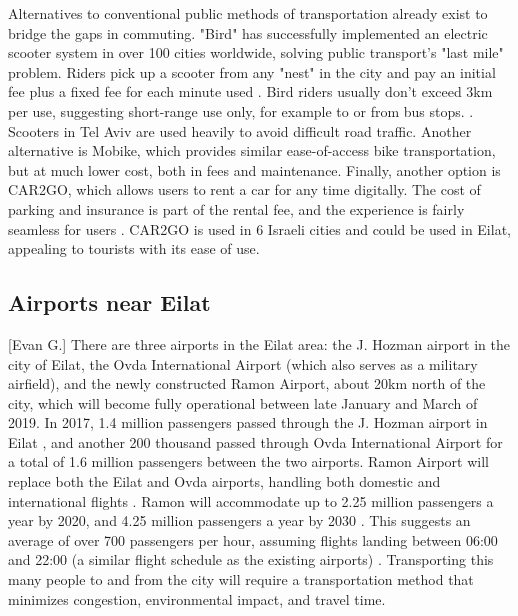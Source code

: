 \documentclass[12pt]{article}                         %
\begin{document}
Alternatives to conventional public methods of transportation already exist to bridge the gaps in commuting. "Bird" has successfully implemented an electric scooter system in over 100 cities worldwide, solving public transport's "last mile" problem. Riders pick up a scooter from any "nest" in the city and pay an initial fee plus a fixed fee for each minute used \cite{Raz-Chaimovich2018BirdGan}. Bird riders usually don't exceed 3km per use, suggesting short-range use only, for example to or from bus stops. \cite{Raz-Chaimovich2018BirdGan}. Scooters in Tel Aviv are used heavily to avoid difficult road traffic. Another alternative is Mobike, which provides similar ease-of-access bike transportation, but at much lower cost, both in fees and maintenance. Finally, another option is CAR2GO, which allows users to rent a car for any time digitally. The cost of parking and insurance is part of the rental fee, and the experience is fairly seamless for users \cite{Dori2018IsraeliStreet}. CAR2GO is used in 6 Israeli cities and could be used in Eilat, appealing to tourists with its ease of use.

\subsection{Airports near Eilat}[Evan G.]
There are three airports in the Eilat area: the J. Hozman airport in the city of Eilat, the Ovda International Airport (which also serves as a military airfield), and the newly constructed Ramon Airport, about 20km north of the city, which will become fully operational between late January and March of 2019. In 2017, 1.4 million passengers passed through the J. Hozman airport in Eilat \cite{IsraeliAirports}, and another 200 thousand passed through Ovda International Airport \cite{IsraeliAirports} for a total of 1.6 million passengers between the two airports. Ramon Airport will replace both the Eilat and Ovda airports, handling both domestic and international flights \cite{IsraelsOpen}. Ramon will accommodate up to 2.25 million passengers a year by 2020, and 4.25 million passengers a year by 2030 \cite{IsraeliAirports}. This suggests an average of over 700 passengers per hour, assuming flights landing between 06:00 and 22:00 (a similar flight schedule as the existing airports) \cite{IsraeliAirports}. Transporting this many people to and from the city will require a transportation method that minimizes congestion, environmental impact, and travel time.
\end{document}
